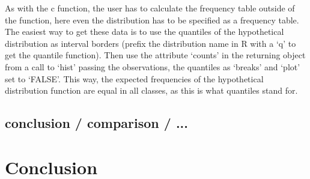 \documentclass{article}
\begin{document}
As with the c function, the user has to calculate the frequency table outside of the function, here even the distribution has to be specified as a frequency table.
The easiest way to get these data is to use the  quantiles of the hypothetical distribution as interval borders (prefix the distribution name in R with a `q' to get the quantile function).
Then use the attribute `counts' in the returning object from a call to `hist' passing the observations, the quantiles as `breaks' and `plot' set to `FALSE'.
This way, the expected frequencies of the hypothetical distribution function are equal in all classes, as this is what quantiles stand for.

\subsection{conclusion / comparison / ...}


\section{Conclusion}


\newpage
\nocite{*}



\begin{appendices}




\end{appendices}
\end{document}
